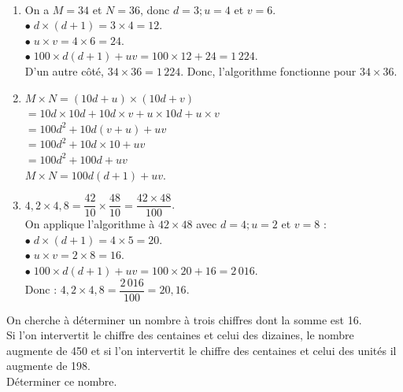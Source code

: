 \begin{corrige}
\ \\ [-5mm]
   \begin{enumerate}
      \item On a $M =34$ et $N =36$, donc $d =3 ; u =4$ et $v =6$. \\
         $\bullet \; d\times(d+1) =3\times4 =12$. \\
         $\bullet \; u\times v =4\times6 =24$. \\
         $\bullet \; 100\times d(d+1)+uv =100\times12+24 =1\,224$. \\
         D'un autre côté, $34\times36 =1\,224$. Donc, {\blue l'algorithme fonctionne pour $34\times36$}.
      \item $M\times N =(10d+u)\times(10d+v)$ \\
         \hspace*{1.47cm} $=10d\times10d+10d\times v+u\times10d+u\times v$ \\
         \hspace*{1.47cm} $=100d^2+10d(v+u)+uv$ \\
         \hspace*{1.47cm} $=100d^2+10d\times10+uv$ \\
         \hspace*{1.47cm} $=100d^2+100d+uv$ \\
         \hspace*{0.36cm} {\blue $M\times N =100d(d+1)+uv.$} \smallskip
      \item $4,2\times4,8 =\dfrac{42}{10}\times\dfrac{48}{10} =\dfrac{42\times48}{100}$. \\ [1mm]
         On applique l'algorithme à $42\times48$ avec $d =4 ; u =2$ et $v =8$ : \\
         $\bullet \; d\times(d+1) =4\times5 =20$. \\
         $\bullet \; u\times v =2\times8 =16$. \\
         $\bullet \; 100\times d(d+1)+uv =100\times20+16 =2\,016$. \\ [1mm]
         Donc : {\blue $4,2\times4,8 =\dfrac{2\,016}{100} =20,16$}.
      \end{enumerate}
\end{corrige}
 
 
\bigskip
 
 
\begin{exercice} %
   On cherche à déterminer un nombre à trois chiffres dont la somme est 16. \\
   Si l'on intervertit le chiffre des centaines et celui des dizaines, le nombre augmente de 450 et si l'on intervertit le chiffre des centaines et celui des unités il augmente de 198. \\
   Déterminer ce nombre.
\end{exercice}


